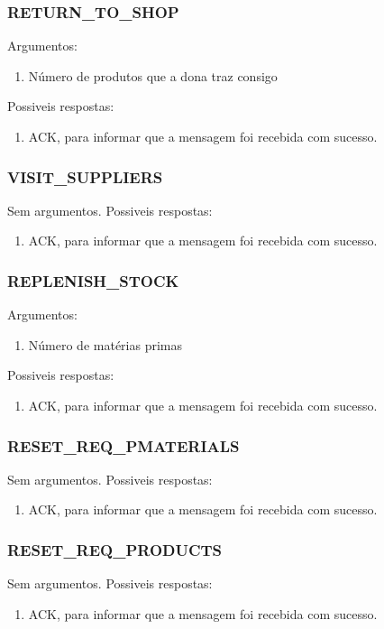 \documentclass[11pt,a4paper]{report}
\begin{document}
\subsubsection{RETURN\_TO\_SHOP} 
Argumentos:
\begin{enumerate}
    \itemsep-0.4em
    \item Número de produtos que a dona traz consigo
\end{enumerate}
Possiveis respostas:
\begin{enumerate}
    \itemsep-0.4em
    \item ACK, para informar que a mensagem foi recebida com sucesso.
\end{enumerate}

\subsubsection{VISIT\_SUPPLIERS}
Sem argumentos.
Possiveis respostas:
\begin{enumerate}
    \itemsep-0.4em
    \item ACK, para informar que a mensagem foi recebida com sucesso.
\end{enumerate}

\subsubsection{REPLENISH\_STOCK}
Argumentos:
\begin{enumerate}
    \itemsep-0.4em
    \item Número de matérias primas
\end{enumerate}
Possiveis respostas:
\begin{enumerate}
    \itemsep-0.4em
    \item ACK, para informar que a mensagem foi recebida com sucesso.
\end{enumerate}

\subsubsection{RESET\_REQ\_PMATERIALS}
Sem argumentos.
Possiveis respostas:
\begin{enumerate}
    \itemsep-0.4em
    \item ACK, para informar que a mensagem foi recebida com sucesso.
\end{enumerate}

\subsubsection{RESET\_REQ\_PRODUCTS}
Sem argumentos.
Possiveis respostas:
\begin{enumerate}
    \itemsep-0.4em
    \item ACK, para informar que a mensagem foi recebida com sucesso.
\end{enumerate}
\end{document}
